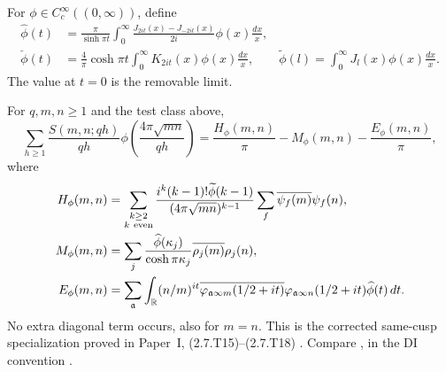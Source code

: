 For $\phi\in C_c^\infty((0,\infty))$, define
\begin{equation}\label{eq:di-transforms}
 \begin{aligned}
 \widehat\phi(t)&=\frac\pi{\sinh\pi t}\int_0^\infty
 \frac{J_{2it}(x)-J_{-2it}(x)}{2i}\phi(x)\frac{dx}x,\\
 \check\phi(t)&=\frac4\pi\cosh\pi t\int_0^\infty
 K_{2it}(x)\phi(x)\frac{dx}x,\qquad
 \widetilde\phi(l)=\int_0^\infty J_l(x)\phi(x)\frac{dx}x.
 \end{aligned}
\end{equation}
The value at $t=0$ is the removable limit.

\begin{fact}\label{fact:p1-corrected}
For $q,m,n\ge1$ and the test class above,
\begin{equation}\label{eq:p1-corrected}
 \sum_{h\ge1}\frac{S(m,n;qh)}{qh}
 \phi\left(\frac{4\pi\sqrt{mn}}{qh}\right)
       =\frac{H_\phi(m,n)}\pi-M_\phi(m,n)-\frac{E_\phi(m,n)}\pi,
\end{equation}
where
\begin{align*}
 H_\phi(m,n)&=\sum_{\substack{k\ge2\\k\ {\rm even}}}
 \frac{i^k(k-1)!\widetilde\phi(k-1)}{(4\pi\sqrt{mn})^{k-1}}
       \sum_f\overline{\psi_f(m)}\psi_f(n),\\
 M_\phi(m,n)&=\sum_j\frac{\widehat\phi(\kappa_j)}{\cosh\pi\kappa_j}
                  \overline{\rho_j(m)}\rho_j(n),\\
 E_\phi(m,n)&=\sum_{\mathfrak a}\int_{\mathbb R}(n/m)^{it}
 \overline{\varphi_{\mathfrak a\infty m}(1/2+it)}
 \varphi_{\mathfrak a\infty n}(1/2+it)\widehat\phi(t)\,dt.
\end{align*}
No extra diagonal term occurs, also for $m=n$.
This is the corrected same-cusp specialization proved in Paper~I,
(2.7.T15)--(2.7.T18) \cite[(2.7.T15)--(2.7.T18)]{PaperI}. Compare
\cite[Lemma~4.5, (4.8)--(4.17)]{Drappeau2017}, in the DI convention
\cite[(1.15)--(1.17)]{DI82}.
\end{fact}


